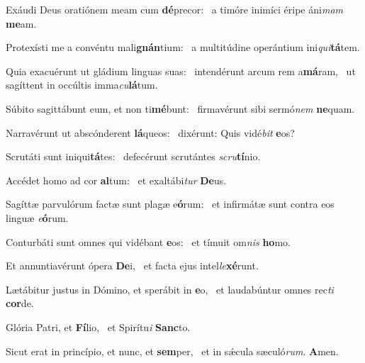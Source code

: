 \item Exáudi Deus oratiónem meam cum \textbf{dé}precor:~\psstar{} a timóre inimíci éripe áni\textit{mam} \textbf{me}am.
\item Protexísti me a convéntu mali\textbf{gnán}tium:~\psstar{} a multitúdine operántium ini\textit{qui}\textbf{tá}tem.
\item Quia exacuérunt ut gládium linguas suas:~\pscross{} intendérunt arcum rem a\textbf{má}ram,~\psstar{} ut sagíttent in occúltis imma\textit{cu}\textbf{lá}tum.
\item Súbito sagittábunt eum, et non ti\textbf{mé}bunt:~\psstar{} firmavérunt sibi sermó\textit{nem} \textbf{ne}quam.
\item Narravérunt ut abscónderent \textbf{lá}queos:~\psstar{} dixérunt: Quis vidé\textit{bit} \textbf{e}os?
\item Scrutáti sunt iniqui\textbf{tá}tes:~\psstar{} defecérunt scrutántes \textit{scru}\textbf{tí}nio.
\item Accédet homo ad cor \textbf{al}tum:~\psstar{} et exaltábi\textit{tur} \textbf{De}us.
\item Sagíttæ parvulórum factæ sunt plagæ e\textbf{ó}rum:~\psstar{} et infirmátæ sunt contra eos linguæ \textit{e}\textbf{ó}rum.
\item Conturbáti sunt omnes qui vidébant \textbf{e}os:~\psstar{} et tímuit om\textit{nis} \textbf{ho}mo.
\item Et annuntiavérunt ópera \textbf{De}i,~\psstar{} et facta ejus intel\textit{le}\textbf{xé}runt.
\item Lætábitur justus in Dómino, et sperábit in \textbf{e}o,~\psstar{} et laudabúntur omnes rec\textit{ti} \textbf{cor}de.
\item Glória Patri, et \textbf{Fí}lio,~\psstar{} et Spirítu\textit{i} \textbf{Sanc}to.
\item Sicut erat in princípio, et nunc, et \textbf{sem}per,~\psstar{} et in sǽcula sæculó\textit{rum}. \textbf{A}men.